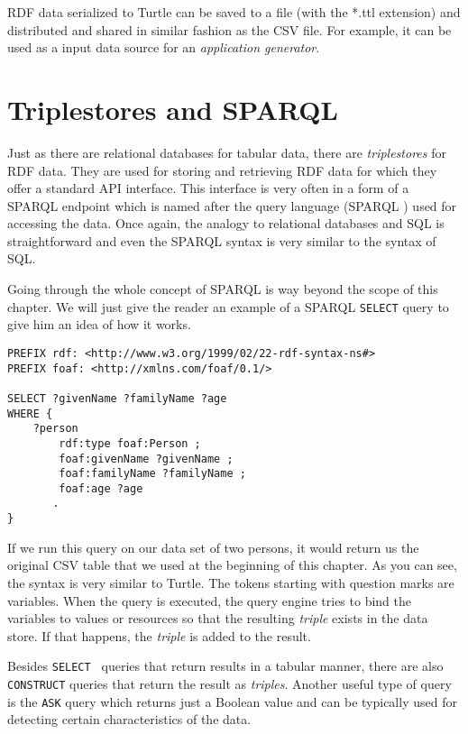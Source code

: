 RDF data serialized to Turtle can be saved to a file (with the *.ttl extension) and distributed and shared in similar fashion as the CSV file. For example, it can be used as a input data source for an \emph{application generator}.

\section{Triplestores and SPARQL}

Just as there are relational databases for tabular data, there are \emph{triplestores} for RDF data. They are used for storing and retrieving RDF data for which they offer a standard API interface. This interface is very often in a form of a SPARQL endpoint which is named after the query language  (SPARQL \cite{sparql}) used for accessing the data. Once again, the analogy to relational databases and SQL is straightforward and even the SPARQL syntax is very similar to the syntax of SQL.

Going through the whole concept of SPARQL is way beyond the scope of this chapter. We will just give the reader an example of a SPARQL \texttt{SELECT} query to give him an idea of how it works.

\begin{verbatim}
PREFIX rdf: <http://www.w3.org/1999/02/22-rdf-syntax-ns#>
PREFIX foaf: <http://xmlns.com/foaf/0.1/>

SELECT ?givenName ?familyName ?age
WHERE {
    ?person
        rdf:type foaf:Person ; 
        foaf:givenName ?givenName ;
        foaf:familyName ?familyName ;
        foaf:age ?age
       . 
}
\end{verbatim}

If we run this query on our data set of two persons, it would return us the original CSV table that we used at the beginning of this chapter. As you can see, the syntax is very similar to Turtle. The tokens starting with question marks are variables. When the query is executed, the query engine tries to bind the variables to values or resources so that the resulting \emph{triple} exists in the data store. If that happens, the \emph{triple} is added to the result.

Besides \texttt{SELECT } queries that return results in a tabular manner, there are also \texttt{CONSTRUCT} queries that return the result as \emph{triples}. Another useful type of query is the \texttt{ASK} query which returns just a Boolean value and can be typically used for detecting certain characteristics of the data.

